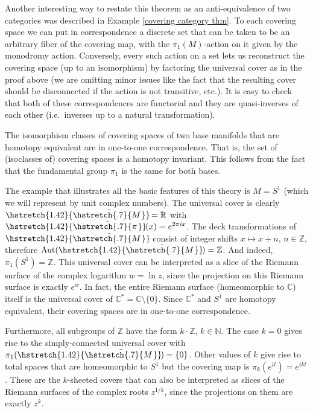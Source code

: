\documentclass[english,letterpaper]{article}%
\numberwithin{equation}{section}
\numberwithin{figure}{section}
\numberwithin{table}{section}
\theoremstyle{definition}
\theoremstyle{definition}
\theoremstyle{definition}
\theoremstyle{plain}
\theoremstyle{plain}
\theoremstyle{plain}
\theoremstyle{plain}
\theoremstyle{remark}
\theoremstyle{remark}
\DeclareMathOperator{\Aut}{Aut}
\newcommand\wt[1]{\hstretch{1.42}{\tilde{\hstretch{.7}{#1\mkern2mu}}}\mkern-2mu}
\begin{document}
Another interesting way to restate this theorem as an anti-equivalence of two categories was described in Example \ref{covering category thm}. To each covering space we can put in correspondence a discrete set that can be taken to be an arbitrary fiber of the covering map, with the $\pi_1(M)$-action on it given by the monodromy action. Conversely, every such action on a set lets us reconstruct the covering space (up to an isomorphism) by factoring the universal cover as in the proof above (we are omitting minor issues like the fact that the resulting cover should be disconnected if the action is not transitive, etc.). It is easy to check that both of these correspondences are functorial and they are quasi-inverses of each other (i.e.\ inverses up to a natural transformation).

\begin{cor}
The isomorphism classes of covering spaces of two base manifolds that are homotopy equivalent are in one-to-one correspondence. That is, the set of (isoclasses of) covering spaces is a homotopy invariant. This follows from the fact that the fundamental group $\pi_1$ is the same for both bases.
\end{cor}

\begin{example}
    The example that illustrates all the basic features of this theory is $M=S^1$ (which we will represent by unit complex numbers). The universal cover is clearly $\wt{M}=\mathbb{R}$ with $\wt\pi(x)=e^{2\pi ix}$. The deck transformations of $\wt M$ consist of integer shifts $x\mapsto x+n$, $n\in \mathbb{Z}$, therefore $\Aut(\wt M)=\mathbb{Z}$. And indeed, $\pi_1(S^1)=\mathbb{Z}$. This universal cover can be interpreted as a slice of the Riemann surface of the complex logarithm $w=\ln z$, since the projection on this Riemann surface is exactly $e^w$. In fact, the entire Riemann surface (homeomorphic to $\mathbb{C}$) itself is the universal cover of $\mathbb{C}^\ast=\mathbb{C}\setminus\{0\}$. Since $\mathbb{C}^\ast$ and $S^1$ are homotopy equivalent, their covering spaces are in one-to-one correspondence.

    Furthermore, all subgroups of $\mathbb{Z}$ have the form $k\cdot \mathbb{Z}$, $k\in\mathbb{N}$. The case $k=0$ gives rise to the simply-connected universal cover with $\pi_1(\wt M)=\{0\}$. Other values of $k$ give rise to total spaces that are homeomorphic to $S^1$ but the covering map is $\pi_k(e^{it})=e^{ikt}$. These are the $k$-sheeted covers that can also be interpreted as slices of the Riemann surfaces of the complex roots $z^{1/k}$, since the projections on them are exactly $z^k$.
\end{example}
\end{document}
